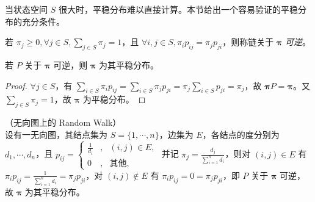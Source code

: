 \documentclass[../main.tex]{subfiles}
\begin{document}
当状态空间 $S$ 很大时，平稳分布难以直接计算。本节给出一个容易验证的平稳分布的充分条件。

\begin{definition}\label{def:7.5.1}
    若 $\pi_j\geq0,\forall j\in S,\sum_{j\in S}\pi_j=1$，且 $\forall i,j\in S,\pi_ip_{ij}=\pi_jp_{ji}$，则称链关于 $\boldsymbol\pi$ \emph{可逆}。
\end{definition}

\begin{theorem}\label{thm:7.5.1}
    若 $P$ 关于 $\boldsymbol\pi$ 可逆，则 $\boldsymbol\pi$ 为其平稳分布。
\end{theorem}

\begin{proof}
    $\forall j\in S$，有 $\sum_{i\in S}\pi_ip_{ij}=\sum_{i\in S}\pi_jp_{ji}=\pi_j\sum_{i\in S}p_{ji}=\pi_j$，故 $\boldsymbol\pi P=\boldsymbol\pi$。又 $\sum_{j\in S}\pi_j=1$，故 $\boldsymbol\pi$ 为平稳分布。
\end{proof}

\begin{example}
    （无向图上的 Random Walk）\\
    设有一无向图，其结点集为 $S=\{1,\cdots,n\}$，边集为 $E$，各结点的度分别为 $d_1,\cdots,d_n$，且 $p_{ij}=
        \left\{\begin{aligned}
            \frac1{d_i} & , & (i,j)\in E,  \\
            0           & , & \text{其他},
        \end{aligned}\right.$ 并记 $\pi_j=\frac{d_j}{\sum_{i=1}^nd_i}$，则对 $(i,j)\in E$ 有 $\pi_ip_{ij}=\frac1{\sum_{i=1}^nd_i}=\pi_jp_{ji}$，对 $(i,j)\notin E$ 有 $\pi_ip_{ij}=0=\pi_jp_{ji}$，即 $P$ 关于 $\boldsymbol\pi$ 可逆，故 $\boldsymbol\pi$ 为其平稳分布。
\end{example}
\end{document}
